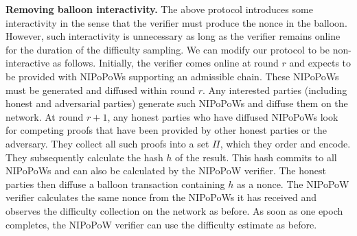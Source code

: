 \noindent\textbf{Removing balloon interactivity.}
The above protocol introduces some interactivity in the sense that the verifier
must produce the nonce in the balloon. However, such interactivity is
unnecessary as long as the verifier remains online for the duration of the
difficulty sampling. We can modify our protocol to be non-interactive as
follows. Initially, the verifier comes online at round $r$ and expects to be
provided with NIPoPoWs supporting an admissible chain. These NIPoPoWs must be
generated and diffused within round $r$. Any interested parties (including
honest and adversarial parties) generate such NIPoPoWs and diffuse them on the
network. At round $r + 1$, any honest parties who have diffused NIPoPoWs look
for competing proofs that have been provided by other honest parties or the
adversary. They collect all such proofs into a set $\mathcal{\Pi}$, which they
order and encode. They subsequently calculate the hash $h$ of the result. This
hash commits to all NIPoPoWs and can also be calculated by the NIPoPoW verifier.
The honest parties then diffuse a balloon transaction containing $h$ as a nonce.
The NIPoPoW verifier calculates the same nonce from the NIPoPoWs it has received
and observes the difficulty collection on the network as before. As soon as one
epoch completes, the NIPoPoW verifier can use the difficulty estimate as before.

